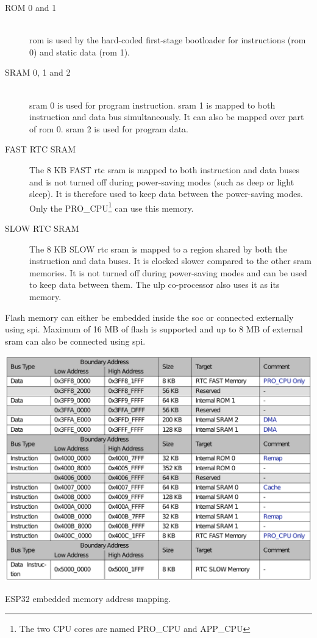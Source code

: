 \begin{description}
    \item[ROM 0 and 1] \hfill \\
        \Gls{rom} is used by the hard-coded first-stage bootloader for instructions (\gls{rom} 0) and static data (\gls{rom} 1).
    \item[SRAM 0, 1 and 2] \hfill \\
        \Gls{sram} 0 is used for program instruction. \Gls{sram} 1 is mapped to both instruction and data bus simultaneously. It can also be mapped over part of \gls{rom} 0. \Gls{sram} 2 is used for program data.
    \item[FAST RTC SRAM] The 8 KB FAST \gls{rtc} \gls{sram} is mapped to both instruction and data buses and is not turned off during power-saving modes (such as deep or light sleep). It is therefore used to keep data between the power-saving modes. Only the PRO\_CPU\footnote{The two CPU cores are named PRO\_CPU and APP\_CPU} can use this memory.
    \item[SLOW RTC SRAM] The 8 KB SLOW \gls{rtc} \gls{sram} is mapped to a region shared by both the instruction and data buses. It is clocked slower compared to the other \gls{sram} memories. It is not turned off during power-saving modes and can be used to keep data between them. The \gls{ulp} co-processor also uses it as its memory.
\end{description}

Flash memory can either be embedded inside the \gls{soc} or connected externally using \gls{spi}. Maximum of 16 MB of flash is supported and up to 8 MB of external \gls{sram} can also be connected using \gls{spi}.

\begin{table}[ht!]
    \centering
    \captionsetup{justification=centering,margin=0.5cm}
    \includegraphics[width=\textwidth]{images/memory_mapping.pdf}
    \caption[ESP32 embedded memory address mapping.]{ESP32 embedded memory address mapping.\cite{esp322021}}
    \label{table:memory_mapping}
\end{table}

